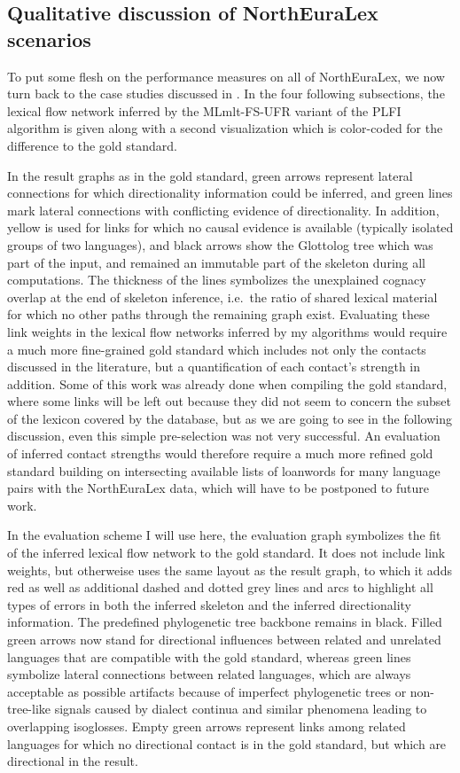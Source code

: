 \subsection{Qualitative discussion of NorthEuraLex scenarios}
 To put some flesh on the performance measures on all of NorthEuraLex, we now turn back to the case studies discussed in . In the four following subsections, the lexical flow network inferred by the MLmlt-FS-UFR variant of the PLFI algorithm is given along with a second visualization which is color-coded for the difference to the gold standard.
 
 In the result graphs as in the gold standard, green arrows represent lateral connections for which directionality information could be inferred, and green lines mark lateral connections with conflicting evidence of directionality. In addition, yellow is used for links for which no causal evidence is available (typically isolated groups of two languages), and black arrows show the Glottolog tree which was part of the input, and remained an immutable part of the skeleton during all computations. The thickness of the lines symbolizes the unexplained cognacy overlap at the end of skeleton inference, i.e.\ the ratio of shared lexical material for which no other paths through the remaining graph exist. Evaluating these link weights in the lexical flow networks inferred by my algorithms would require a much more fine-grained gold standard which includes not only the contacts discussed in the literature, but a quantification of each contact's strength in addition. Some of this work was already done when compiling the gold standard, where some links will be left out because they did not seem to concern the subset of the lexicon covered by the database, but as we are going to see in the following discussion, even this simple pre-selection was not very successful. An evaluation of inferred contact strengths would therefore require a much more refined gold standard building on intersecting available lists of loanwords for many language pairs with the NorthEuraLex data, which will have to be postponed to future work.
 
 In the evaluation scheme I will use here, the evaluation graph symbolizes the fit of the inferred lexical flow network to the gold standard. It does not include link weights, but otherweise uses the same layout as the result graph, to which it adds red as well as additional dashed and dotted grey lines and arcs to highlight all types of errors in both the inferred skeleton and the inferred directionality information. The predefined phylogenetic tree backbone remains in black. Filled green arrows now stand for directional influences between related and unrelated languages that are compatible with the gold standard, whereas green lines symbolize lateral connections between related languages, which are always acceptable as possible artifacts because of imperfect phylogenetic trees or non-tree-like signals caused by dialect continua and similar phenomena leading to overlapping isoglosses. Empty green arrows represent links among related languages for which no directional contact is in the gold standard, but which are directional in the result.
 
